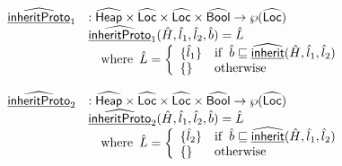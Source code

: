 \documentclass{article}
\newcommand{\lbr}{\ensuremath{\llbracket}}
\newcommand{\rbr}{\ensuremath{\rrbracket}}
\newcommand{\ifc}[1]{{\rm if}\begin{array}[t]{l}#1\end{array}}
\newcommand{\SF}[1]{\mbox{\textsf{#1}}}
\newcommand{\wherec}[1]{{\rm where}\begin{array}[t]{l}#1\end{array}}
\newcommand{\owc}{{\rm otherwise}}
\newcommand{\abs}[1]{\widehat{\SF{#1}}}
\newcommand{\aHeap}{\abs{Heap}}
\newcommand{\aLoc}{\abs{Loc}}
\newcommand{\aV}{\hat{\mathcal{V}}}
\newcommand{\powerset}[1]{\wp(#1)}
\newcommand{\ahf}[1]{\widehat{\underline{\sf #1}}}
\newcommand{\rel}{\S}
\begin{document}
\[\begin{array}{lll}
\ahf {inheritProto}_1 &:  \aHeap \times \aLoc \times \aLoc \times \abs{Bool} \rightarrow \powerset{\aLoc}\\
& \ahf {inheritProto}_1 (\hat{H}, \hat{l}_1, \hat{l}_2, \hat{b}) = \hat{L}\\
& \quad \wherec{
  \hat{L} = \left\{
    \begin{array}{ll}
      \{ \hat{l}_1 \} & \ifc{ \hat{b} \sqsubseteq \ahf{inherit}(\hat{H}, \hat{l}_1, \hat{l}_2)}\\
      \{ \} & \owc\\
    \end{array}
  \right.\\
}
\\\\
\ahf {inheritProto}_2 &:  \aHeap \times \aLoc \times \aLoc \times \abs{Bool} \rightarrow \powerset{\aLoc}\\
& \ahf {inheritProto}_2 (\hat{H}, \hat{l}_1, \hat{l}_2, \hat{b}) = \hat{L}\\
& \quad \wherec{
  \hat{L} = \left\{
    \begin{array}{ll}
      \{ \hat{l}_2 \} & \ifc{ \hat{b} \sqsubseteq \ahf{inherit}(\hat{H}, \hat{l}_1, \hat{l}_2)}\\
      \{ \} & \owc\\
    \end{array}
  \right.\\
}
\\\\
 \end{array}
\]
\end{document}

